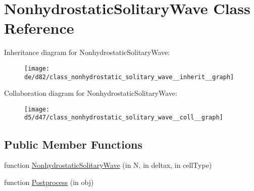 \hypertarget{class_nonhydrostatic_solitary_wave}{}\section{Nonhydrostatic\+Solitary\+Wave Class Reference}
\label{class_nonhydrostatic_solitary_wave}


Inheritance diagram for Nonhydrostatic\+Solitary\+Wave\+:
\nopagebreak
\begin{figure}[H]
\begin{center}
\leavevmode
\texttt{[image: de/d82/class\_nonhydrostatic\_solitary\_wave\_\_inherit\_\_graph]}
\end{center}
\end{figure}


Collaboration diagram for Nonhydrostatic\+Solitary\+Wave\+:
\nopagebreak
\begin{figure}[H]
\begin{center}
\leavevmode
\texttt{[image: d5/d47/class\_nonhydrostatic\_solitary\_wave\_\_coll\_\_graph]}
\end{center}
\end{figure}
\subsection*{Public Member Functions}
\begin{DoxyCompactItemize}
\item 
function \hyperlink{class_nonhydrostatic_solitary_wave_adacd867d37ebee11a31784ca6c47cb2d}{Nonhydrostatic\+Solitary\+Wave} (in N, in deltax, in cell\+Type)
\item 
function \hyperlink{class_nonhydrostatic_solitary_wave_aeb4622b08d1b768ed59d74ddaf72d0b3}{Postprocess} (in obj)
\end{DoxyCompactItemize}
